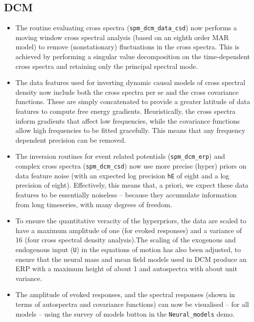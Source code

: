 \documentclass[a4paper,titlepage,openany]{article}
\begin{document}
\subsection{DCM}

\begin{itemize}
\item The routine evaluating cross spectra (\texttt{spm\_dcm\_data\_csd}) now performs a moving window cross spectral analysis (based on an eighth order MAR model) to remove (nonstationary) fluctuations in the cross spectra. This is achieved by performing a singular value decomposition on the time-dependent cross spectra and retaining only the principal spectral mode.
\item The data features used for inverting dynamic causal models of cross spectral density now include both the cross spectra per se and the cross covariance functions. These are simply concatenated to provide a greater latitude of data features to compute free energy gradients. Heuristically, the cross spectra inform gradients that affect low frequencies, while the covariance functions allow high frequencies to be fitted gracefully. This means that any frequency dependent precision can be removed.
\item The inversion routines for event related potentials (\texttt{spm\_dcm\_erp}) and complex cross spectra (\texttt{spm\_dcm\_csd}) now use more precise (hyper) priors on data feature noise (with an expected log precision \texttt{hE} of eight and a log precision of eight). Effectively, this means that, a priori, we expect these data features to be essentially noiseless -- because they accumulate information from long timeseries, with many degrees of freedom.
\item To ensure the quantitative veracity of the hyperpriors, the data are scaled to have a maximum amplitude of one (for evoked responses) and a variance of 16 (four cross spectral density analysis).The scaling of the exogenous and endogenous input (\texttt{U}) in the equations of motion has also been adjusted, to ensure that the neural mass and mean field models used in DCM produce an ERP with a maximum height of about 1 and autospectra with about unit variance.
\item The amplitude of evoked responses, and the spectral responses (shown in terms of autospectra and covariance functions) can now be visualised -- for all models -- using the survey of models button in the \texttt{Neural\_models} demo.
\end{itemize}
\end{document}
